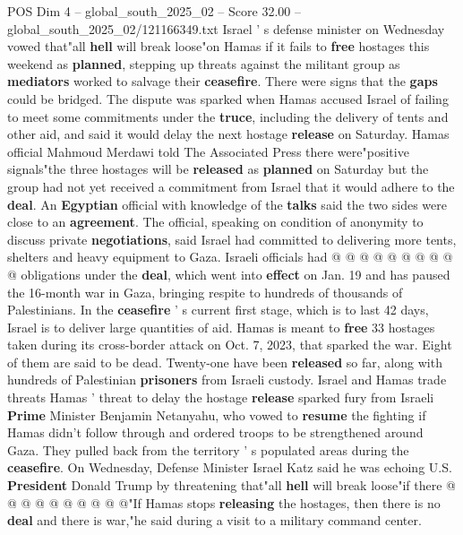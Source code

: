 \begin{textsample}{POS Dim 4 – global\_south\_2025\_02 – Score 32.00 – global\_south\_2025\_02/121166349.txt}  \label{ex:f4_pos_023}
Israel ' s defense minister on Wednesday vowed that"all \textbf{hell} will break loose"on Hamas if it fails to \textbf{free} hostages this weekend as \textbf{planned}, stepping up threats against the militant group as \textbf{mediators} worked to salvage their \textbf{ceasefire}.
There were signs that the \textbf{gaps} could be bridged.
The dispute was sparked when Hamas accused Israel of failing to meet some commitments under the \textbf{truce}, including the delivery of tents and other aid, and said it would delay the next hostage \textbf{release} on Saturday.
Hamas official Mahmoud Merdawi told The Associated Press there were"positive signals"the three hostages will be \textbf{released} as \textbf{planned} on Saturday but the group had not yet received a commitment from Israel that it would adhere to the \textbf{deal}.
An \textbf{Egyptian} official with knowledge of the \textbf{talks} said the two sides were close to an \textbf{agreement}.
The official, speaking on condition of anonymity to discuss private \textbf{negotiations}, said Israel had committed to delivering more tents, shelters and heavy equipment to Gaza.
Israeli officials had @ @ @ @ @ @ @ @ @ @ obligations under the \textbf{deal}, which went into \textbf{effect} on Jan. 19 and has paused the 16-month war in Gaza, bringing respite to hundreds of thousands of Palestinians.
In the \textbf{ceasefire} ' s current first stage, which is to last 42 days, Israel is to deliver large quantities of aid.
Hamas is meant to \textbf{free} 33 hostages taken during its cross-border attack on Oct. 7, 2023, that sparked the war.
Eight of them are said to be dead.
Twenty-one have been \textbf{released} so far, along with hundreds of Palestinian \textbf{prisoners} from Israeli custody.
Israel and Hamas trade threats Hamas ' threat to delay the hostage \textbf{release} sparked fury from Israeli \textbf{Prime} Minister Benjamin Netanyahu, who vowed to \textbf{resume} the fighting if Hamas didn't follow through and ordered troops to be strengthened around Gaza.
They pulled back from the territory ' s populated areas during the \textbf{ceasefire}.
On Wednesday, Defense Minister Israel Katz said he was echoing U.S. \textbf{President} Donald Trump by threatening that"all \textbf{hell} will break loose"if there @ @ @ @ @ @ @ @ @ @"If Hamas stops \textbf{releasing} the hostages, then there is no \textbf{deal} and there is war,"he said during a visit to a military command center.

\end{textsample}
